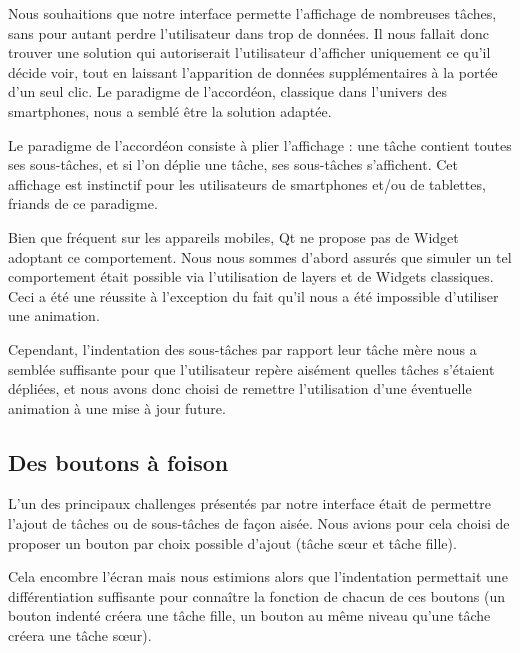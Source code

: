 \documentclass[11pt]{article}
\begin{document}
Nous souhaitions que notre interface permette l'affichage de
nombreuses tâches, sans pour autant perdre l'utilisateur dans trop de
données. Il nous fallait donc trouver une solution qui autoriserait
l'utilisateur d'afficher uniquement ce qu'il décide voir, tout en
laissant l'apparition de données supplémentaires à la portée d'un seul
clic. Le paradigme de l'accordéon, classique dans l'univers des
smartphones, nous a semblé être la solution adaptée.

Le paradigme de l'accordéon consiste à plier l'affichage : une tâche
contient toutes ses sous-tâches, et si l'on déplie une tâche, ses
sous-tâches s'affichent. Cet affichage est instinctif pour les
utilisateurs de smartphones et/ou de tablettes, friands de ce
paradigme.

Bien que fréquent sur les appareils mobiles, Qt ne propose pas de
Widget adoptant ce comportement. Nous nous sommes d'abord assurés que
simuler un tel comportement était possible via l'utilisation de layers
et de Widgets classiques. Ceci a été une réussite à l'exception du
fait qu'il nous a été impossible d'utiliser une animation.

Cependant, l'indentation des sous-tâches par rapport leur tâche mère
nous a semblée suffisante pour que l'utilisateur repère aisément
quelles tâches s'étaient dépliées, et nous avons donc choisi de
remettre l'utilisation d'une éventuelle animation à une mise à jour
future.




\subsection{Des boutons à foison}

L'un des principaux challenges présentés par notre interface était de
permettre l'ajout de tâches ou de sous-tâches de façon aisée. Nous
avions pour cela choisi de proposer un bouton par choix possible
d'ajout (tâche sœur et tâche fille).

Cela encombre l'écran mais nous estimions alors que l'indentation
permettait une différentiation suffisante pour connaître la fonction
de chacun de ces boutons (un bouton indenté créera une tâche fille, un
bouton au même niveau qu'une tâche créera une tâche sœur).
\end{document}
